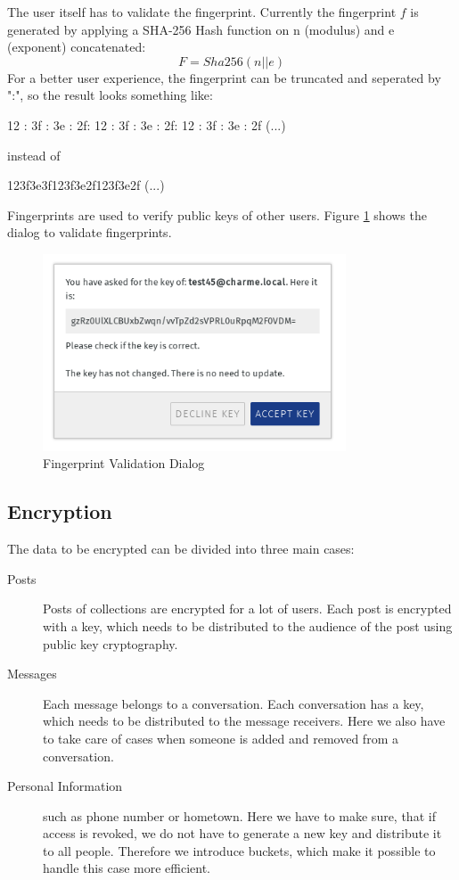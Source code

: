\documentclass{scrartcl}
\begin{document}
The user itself has to validate the fingerprint. Currently the fingerprint $f$ is generated by applying a SHA-256 Hash function on n (modulus) and e (exponent) concatenated:
   $$
   F = Sha256(n || e)
   $$
 For a better user experience, the fingerprint can be truncated and  seperated by ":", so the result looks something like:
  
   \begin{center}
   12 : 3f : 3e : 2f: 12 : 3f : 3e : 2f: 12 : 3f : 3e : 2f (...)
   \end{center}
  
  instead of 
  
  \begin{center}
  123f3e3f123f3e2f123f3e2f (...)
  \end{center}
  
  Fingerprints are used to verify public keys of other users.
  Figure \ref{figFP} shows the dialog to validate fingerprints.
  \begin{figure}[ht]
	\centering
  \includegraphics[width=90mm]{illustrations/fingerprint.png}
	\caption{Fingerprint Validation Dialog}
	\label{figFP}
\end{figure}



  
 \subsection{Encryption}
The data to be encrypted can be divided into three main cases:

\begin{description}
  \item[Posts] Posts of collections are encrypted for a lot of users. Each post is encrypted with a key, which needs to be distributed to the audience of the post using public key cryptography.
  \item[Messages] Each message belongs to a conversation. Each conversation has a key, which needs to be distributed to the message receivers. Here we also have to take care of cases when someone is added and removed from a conversation.
  \item[Personal Information] such as phone number or hometown. Here we have to make sure, that if access is revoked, we do not have to generate a new key and distribute it to all people. Therefore we introduce buckets, which make it possible to handle this case more efficient.
\end{description}
\end{document}
